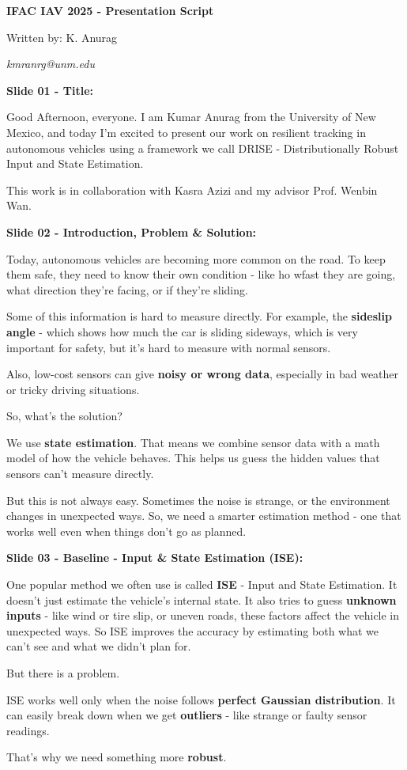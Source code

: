 \documentclass[handout, aspectratio=169]{beamer}
\begin{document}
\begin{frame}
    \textbf{IFAC IAV 2025 - Presentation Script}
    
    Written by: K. Anurag

    \textit{kmranrg@unm.edu}
\end{frame}

\begin{frame}
    \textbf{Slide 01 - Title:}
    
    Good Afternoon, everyone. I am Kumar Anurag from the University of New Mexico, and today I'm excited to present our work on resilient tracking in autonomous vehicles using a framework we call DRISE - Distributionally Robust Input and State Estimation.

    This work is in collaboration with Kasra Azizi and my advisor Prof. Wenbin Wan.
\end{frame}

\begin{frame}
    \textbf{Slide 02 - Introduction, Problem \& Solution:}

    Today, autonomous vehicles are becoming more common on the road. To keep them safe, they need to know their own condition - like ho wfast they are going, what direction they're facing, or if they're sliding.

    Some of this information is hard to measure directly. For example, the \textbf{sideslip angle} - which shows how much the car is sliding sideways, which is very important for safety, but it's hard to measure with normal sensors.

    Also, low-cost sensors can give \textbf{noisy or wrong data}, especially in bad weather or tricky driving situations.

    So, what's the solution?

    We use \textbf{state estimation}. That means we combine sensor data with a math model of how the vehicle behaves. This helps us guess the hidden values that sensors can't measure directly.

    But this is not always easy. Sometimes the noise is strange, or the environment changes in unexpected ways. So, we need a smarter estimation method - one that works well even when things don't go as planned.
\end{frame}

\begin{frame}
    \textbf{Slide 03 - Baseline - Input \& State Estimation (ISE):}
    
    One popular method we often use is called \textbf{ISE} - Input and State Estimation. It doesn't just estimate the vehicle's internal state. It also tries to guess \textbf{unknown inputs} - like wind or tire slip, or uneven roads, these factors affect the vehicle in unexpected ways. So ISE improves the accuracy by estimating both what we can't see and what we didn't plan for. 

    But there is a problem.

    ISE works well only when the noise follows \textbf{perfect Gaussian distribution}. It can easily break down when we get \textbf{outliers} - like strange or faulty sensor readings.

    That's why we need something more \textbf{robust}.
\end{frame}
\end{document}
